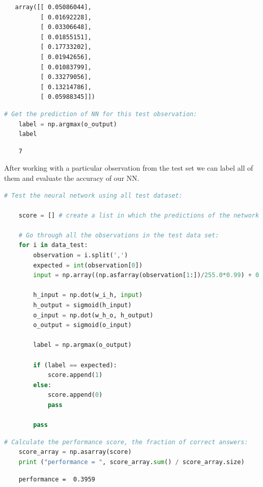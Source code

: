 \begin{lstlisting}
   array([[ 0.05086044],
          [ 0.01692228],
          [ 0.03306648],
          [ 0.01855151],
          [ 0.17733202],
          [ 0.01942656],
          [ 0.01083799],
          [ 0.33279056],
          [ 0.13214786],
          [ 0.05988345]])
\end{lstlisting}

\begin{lstlisting}[language=Python]
    # Get the prediction of NN for this test observation:
    label = np.argmax(o_output)
    label
\end{lstlisting}

\begin{lstlisting}
    7
\end{lstlisting}

After working with a particular observation from the test set we can label all of them and evaluate the accuracy of our NN.

\begin{lstlisting}[language=Python]   
    # Test the neural network using all test dataset:
    
    score = [] # create a list in which the predictions of the network will we saved.
    
    # Go through all the observations in the test data set:
    for i in data_test:
        observation = i.split(',')
        expected = int(observation[0])
        input = np.array((np.asfarray(observation[1:])/255.0*0.99) + 0.01, ndmin=2).T
    
        h_input = np.dot(w_i_h, input)
        h_output = sigmoid(h_input)
        o_input = np.dot(w_h_o, h_output)
        o_output = sigmoid(o_input)
    
        label = np.argmax(o_output)
    
        if (label == expected):
            score.append(1)
        else:
            score.append(0)
            pass
        
        pass
\end{lstlisting}

\begin{lstlisting}[language=Python]   
    # Calculate the performance score, the fraction of correct answers:
    score_array = np.asarray(score)
    print ("performance = ", score_array.sum() / score_array.size)
    \end{lstlisting}

\begin{lstlisting}
    performance =  0.3959
\end{lstlisting}

